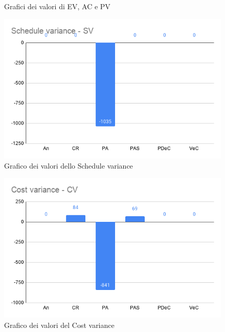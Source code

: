         \begin{figure}
            \centering
            \caption{Grafici dei valori di EV, AC e PV}\label{Y}
            \end{figure}


        \begin{figure}[H]
            \centering
            \includegraphics[width=13 cm]{source/sections/images/schedule_variance.png}
            \caption{Grafico dei valori dello Schedule variance}
        \end{figure}

        \begin{figure}[H]
            \centering
            \includegraphics[width=13 cm]{source/sections/images/cost_variance.png}
            \caption{Grafico dei valori del Cost variance}
        \end{figure}
